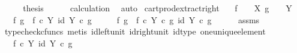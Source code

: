 \begin{isabellebody}
\ \ \isamarkupfalse%
\ \isamarkupfalse%
\ {\isacharquery}{\kern0pt}thesis\isanewline
\ \ \ \ \isamarkupfalse%
\ calculation\ \isamarkupfalse%
\ auto\isanewline
{}\isamarkupfalse%
%
\endisatagproof
{\isafoldproof}%
%
\isadelimproof
\isanewline
%
\endisadelimproof
\isanewline
{}\isamarkupfalse%
\ cart{\isacharunderscore}{\kern0pt}prod{\isacharunderscore}{\kern0pt}extract{\isacharunderscore}{\kern0pt}right{\isacharcolon}{\kern0pt}\isanewline
\ \ \ {\isachardoublequoteopen}f\ {\isacharcolon}{\kern0pt}\ {\isasymone}\ {\isasymrightarrow}\ X{\isachardoublequoteclose}\ {\isachardoublequoteopen}g\ {\isacharcolon}{\kern0pt}\ {\isasymone}\ {\isasymrightarrow}\ Y{\isachardoublequoteclose}\isanewline
\ \ \ {\isachardoublequoteopen}{\isasymlangle}f{\isacharcomma}{\kern0pt}\ g{\isasymrangle}\ {\isacharequal}{\kern0pt}\ {\isasymlangle}f\ {\isasymcirc}\isactrlsub c\ {\isasymbeta}\isactrlbsub Y\isactrlesub {\isacharcomma}{\kern0pt}\ id\ Y{\isasymrangle}\ {\isasymcirc}\isactrlsub c\ g{\isachardoublequoteclose}\isanewline
%
\isadelimproof
%
\endisadelimproof
%
\isatagproof
{}\isamarkupfalse%
\ {\isacharminus}{\kern0pt}\isanewline
\ \ \isamarkupfalse%
\ {\isachardoublequoteopen}{\isasymlangle}f{\isacharcomma}{\kern0pt}\ g{\isasymrangle}\ {\isacharequal}{\kern0pt}\ {\isasymlangle}f\ {\isasymcirc}\isactrlsub c\ {\isasymbeta}\isactrlbsub Y\isactrlesub \ {\isasymcirc}\isactrlsub c\ g{\isacharcomma}{\kern0pt}\ id\ Y\ {\isasymcirc}\isactrlsub c\ g{\isasymrangle}{\isachardoublequoteclose}\isanewline
\ \ \ \ \isamarkupfalse%
\ assms\ \isamarkupfalse%
\ {\isacharparenleft}{\kern0pt}typecheck{\isacharunderscore}{\kern0pt}cfuncs{\isacharcomma}{\kern0pt}\ metis\ id{\isacharunderscore}{\kern0pt}left{\isacharunderscore}{\kern0pt}unit{}\ id{\isacharunderscore}{\kern0pt}right{\isacharunderscore}{\kern0pt}unit{}\ id{\isacharunderscore}{\kern0pt}type\ one{\isacharunderscore}{\kern0pt}unique{\isacharunderscore}{\kern0pt}element{\isacharparenright}{\kern0pt}\isanewline
\ \ \isamarkupfalse%
\ \isamarkupfalse%
\ {\isachardoublequoteopen}{\isachardot}{\kern0pt}{\isachardot}{\kern0pt}{\isachardot}{\kern0pt}\ {\isacharequal}{\kern0pt}\ {\isasymlangle}f\ {\isasymcirc}\isactrlsub c\ {\isasymbeta}\isactrlbsub Y\isactrlesub {\isacharcomma}{\kern0pt}\ id\ Y{\isasymrangle}\ {\isasymcirc}\isactrlsub c\ g{\isachardoublequoteclose}\isanewline
\ \ \ \ \isamarkupfalse%

\end{isabellebody}
